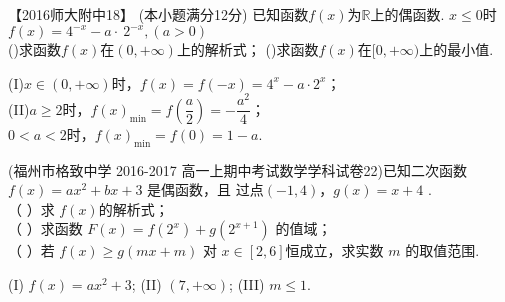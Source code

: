 \begin{exercise}
      【2016师大附中18】 (本小题满分12分)
      已知函数$f(x)$为$\mathbb{R}$上的偶函数. $x\leq0$时$f(x)=4^{-x}-a\cdot~2^{-x},(a>0)$\\
      ()求函数$f(x)$在$(0,+\infty)$上的解析式；
      ()求函数$f(x)$在$[0,+\infty)$上的最小值.
      \begin{answer}
        (I)$x\in(0,+\infty)$时，$f(x)=f(-x)=4^x-a\cdot 2^x$；\\
        (II)$a\geq2$时，$f(x)_{\min}=f(\dfrac{a}2)=-\dfrac{a^2}4$；\\
            $0<a<2$时，$f(x)_{\min}=f(0)=1-a$.
      \end{answer}
    \vspace{18em}
    \item
      (福州市格致中学 2016-2017 高一上期中考试数学学科试卷22)已知二次函数 $f ( x )= ax^2+ bx+3$ 是偶函数，且 过点$(-1,4)$，$ g ( x )= x + 4$ .\\
      （ ）求 $f (x) $的解析式；\\
      （ ）求函数 $F ( x )= f (2^x )+ g (2^{x+1} )$ 的值域； \\
      （ ）若 $f ( x ) \geq g ( mx +m )$ 对 $x\in [2, 6] $恒成立，求实数 $m$ 的取值范围.\\
      \begin{answer}
      (I) $f(x)=ax^2+3$; (II) $(7,+\infty)$; (III) $m\leq1$.
      \end{answer}
      \vspace{13em}
    \vspace{12em}
  \end{exercise}

\newpage
